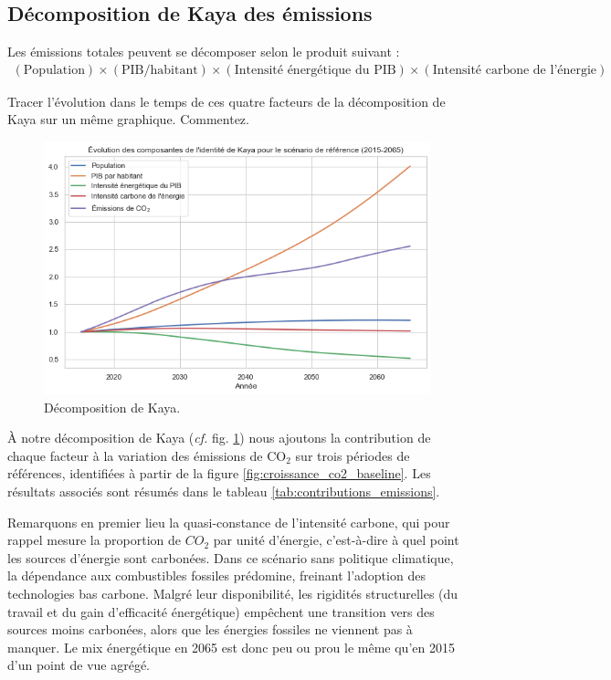 \documentclass[a4,11pt]{aleph-notas}
\newcommand{\ans}[1]{
\begin{mdframed}[
    roundcorner=10pt,     %
    backgroundcolor=gray!20, %
    linecolor=black,      %
    linewidth=1pt,        %
    innertopmargin=10pt,  %
    innerbottommargin=10pt, %
    innerleftmargin=10pt,  %
    innerrightmargin=10pt  %
]
#1
\end{mdframed}
}
\begin{document}
\subsection{Décomposition de Kaya des émissions}
Les émissions totales peuvent se décomposer selon le produit suivant :
\begin{align*}
    (\text{Population}) \times (\text{PIB/habitant}) \times (\text{Intensité énergétique du PIB}) \times (\text{Intensité carbone de l’énergie})
\end{align*} 
\ans{Tracer l’évolution dans le temps de ces quatre facteurs de la décomposition de Kaya sur un même graphique. Commentez.}

\begin{figure}[H]
    \centering
    \includegraphics[width=\textwidth]{images_IMACLIM/kaya_baseline.png}
    \caption{Décomposition de Kaya.}
    \label{fig:kaya_baseline}
\end{figure}

À notre décomposition de Kaya (\textit{cf.} fig. \ref{fig:kaya_baseline}) nous ajoutons la contribution de chaque facteur à la variation des émissions de CO$_2$ sur trois périodes de références, identifiées à partir de la figure \ref{fig:croissance_co2_baseline}. Les résultats associés sont résumés dans le tableau \ref{tab:contributions_emissions}.

Remarquons en premier lieu la quasi-constance de l’intensité carbone, qui pour rappel mesure la proportion de $CO_2$ par unité d'énergie, c'est-à-dire à quel point les sources d'énergie sont carbonées. Dans ce scénario sans politique climatique, la dépendance aux combustibles fossiles prédomine, freinant l’adoption des technologies bas carbone. Malgré leur disponibilité, les rigidités structurelles (du travail et du gain d'efficacité énergétique) empêchent une transition vers des sources moins carbonées, alors que les énergies fossiles ne viennent pas à manquer. Le mix énergétique en 2065 est donc peu ou prou le même qu'en 2015 d'un point de vue agrégé. 
\end{document}
